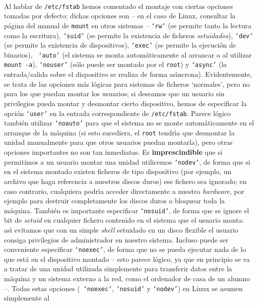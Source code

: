 \\Al hablar de {\tt /etc/fstab} hemos comentado el montaje con ciertas opciones
tomadas por defecto; dichas opciones son -- en el caso de Linux, consultar la
p\'agina del manual de {\tt mount} en otros sistemas -- {\tt `rw'} (se permite
tanto la lectura como la escritura), {\tt `suid'} (se permite la existencia de
ficheros {\it setuidados}), {\tt `dev'} (se permite la existencia de 
dispositivos), {\tt `exec'} (se permite la ejecuci\'on de binarios), {\tt 
`auto'} (el sistema se monta autom\'aticamente al arrancar o al utilizar {\tt
mount -a}), {\tt `nouser'} 
(s\'olo puede ser montado por el {\tt root}) y {\tt `async'} (la entrada/salida
sobre el dispositivo se realiza de forma as\'{\i}ncrona). Evidentemente, se
trata de las opciones m\'as l\'ogicas para sistemas de ficheros `normales',
pero no para los que puedan montar los usuarios; si deseamos que un usuario sin
privilegios pueda montar y desmontar cierto dispositivo, hemos de especificar
la opci\'on {\tt `user'} en la entrada correspondiente de {\tt /etc/fstab}.
Parece l\'ogico tambi\'en utilizar {\tt `noauto'} para que el sistema no se
monte autom\'aticamente en el arranque de la m\'aquina (si esto sucediera, 
el {\tt root} tendr\'{\i}a que desmontar la unidad manualmente para que otros
usuarios puedan montarla), pero otras opciones importantes no son tan 
inmediatas. Es {\bf imprescindible} que si permitimos a un usuario montar 
una unidad utilicemos {\tt `nodev'}, de forma que si en el sistema montado
existen ficheros de tipo dispositivo (por ejemplo, un archivo que haga 
referencia a nuestros discos duros) ese fichero sea ignorado; en caso contrario,
cualquiera podr\'{\i}a acceder directamente a nuestro {\it hardware}, por 
ejemplo para destruir completamente los discos duros o bloquear toda la 
m\'aquina. Tambi\'en es importante especificar {\tt `nosuid'}, de forma que
se ignore el bit de {\it setuid} en cualquier fichero contenido en el sistema
que el usuario monta: as\'{\i} evitamos que con un simple {\it shell} setuidado
en un disco flexible el usuario consiga privilegios de administrador en nuestro
sistema. Incluso puede ser conveniente especificar {\tt `noexec'}, de forma
que no se pueda ejecutar nada de lo que est\'a en el dispositivo montado -- 
esto parece l\'ogico, ya que en principio se va a tratar de una unidad utilizada
simplemente para transferir datos entre la m\'aquina y un sistema externo a la
red, como el ordenador de casa de un alumno --. Todas estas opciones ({\tt
`noexec'}, {\tt `nosuid'} y {\tt `nodev'}) en Linux se asumen simplemente al
